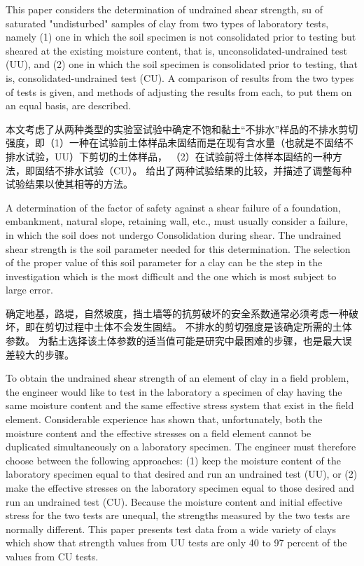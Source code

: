 \begin{paracol}{2}
    
    This paper considers the determination of undrained shear strength, su of saturated "undisturbed" samples of clay from two types of laboratory tests, namely (1) one in which the soil specimen is not consolidated prior to testing but sheared at the existing moisture content, that is, unconsolidated-undrained test (UU), and (2) one in which the soil specimen is consolidated prior to testing, that is, consolidated-undrained test (CU). A comparison of results from the two types of tests is given, and methods of adjusting the results from each, to put them on an equal basis, are described.

    \switchcolumn

    本文考虑了从两种类型的实验室试验中确定不饱和黏土“不排水”样品的不排水剪切强度，即（1）一种在试验前土体样品未固结而是在现有含水量（也就是不固结不排水试验，UU）下剪切的土体样品， （2）在试验前将土体样本固结的一种方法，即固结不排水试验（CU）。 给出了两种试验结果的比较，并描述了调整每种试验结果以使其相等的方法。

    \switchcolumn*

    A determination of the factor of safety against a shear failure of a foundation, embankment, natural slope, retaining wall, etc., must usually consider a failure, in which the soil does not undergo Consolidation during shear. The undrained shear strength is the soil parameter needed for this determination. The selection of the proper value of this soil parameter for a clay can be the step in the investigation which is the most difficult and the one which is most subject to large error. 

    \switchcolumn
   
    确定地基，路堤，自然坡度，挡土墙等的抗剪破坏的安全系数通常必须考虑一种破坏，即在剪切过程中土体不会发生固结。 不排水的剪切强度是该确定所需的土体参数。 为黏土选择该土体参数的适当值可能是研究中最困难的步骤，也是最大误差较大的步骤。

    \switchcolumn*

    To obtain the undrained shear strength of an element of clay in a field problem, the engineer would like to test in the laboratory a specimen of clay having the same moisture content and the same effective stress system that exist in the field element. Considerable experience has shown that, unfortunately, both the moisture content and the effective stresses on a field element cannot be duplicated simultaneously on a laboratory specimen. The engineer must therefore choose between the following approaches: (1) keep the moisture content of the laboratory specimen equal to that desired and run an undrained test (UU), or (2) make the effective stresses on the laboratory specimen equal to those desired and run an undrained test (CU). Because the moisture content and initial effective stress for the two tests are unequal, the strengths measured by the two tests are normally different. This paper presents test data from a wide variety of clays which show that strength values from UU tests are only 40 to 97 percent of the values from CU tests.


\end{paracol}
